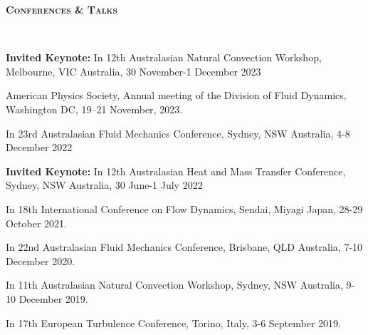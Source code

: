 \documentclass[letterpaper, 10pt]{article}
\newenvironment{changemargin}[2]{%
  \begin{list}{}{%
      \setlength{\topsep}{0pt}%
      \setlength{\leftmargin}{#1}%
      \setlength{\rightmargin}{#2}%
      \setlength{\listparindent}{\parindent}%
      \setlength{\itemindent}{\parindent}%
      \setlength{\parsep}{\parskip}%
    }%
  \item[]}{\end{list}
}
\newcommand{\lineover}{
  \begin{changemargin}{-0.05in}{-0.05in}
    \vspace*{-8pt}
    \hrulefill \\
    \vspace*{-2pt}
  \end{changemargin}
}
\newcommand{\header}[1]{
  \begin{changemargin}{-0.5in}{-0.5in}
    \textbf{\scshape{#1}}\\
    \lineover
  \end{changemargin}
}
\newenvironment{body} {
  \vspace*{-16pt}
  \begin{changemargin}{-0.25in}{-0.5in}
  }
  {\end{changemargin}
}
\begin{document}
\header{Conferences \& Talks}
\begin{body}
  \vspace{14pt}

  {\bf Invited Keynote:} %
  In 12th Australasian Natural Convection Workshop, Melbourne, VIC Australia, 30 November-1 December 2023
  
  \smallskip

American Physics Society, Annual meeting of the Division of Fluid Dynamics, Washington DC, 19--21 November, 2023.
    
  \smallskip
  
  In 23rd Australasian Fluid Mechanics Conference, Sydney, NSW Australia, 4-8 December 2022
  
  \smallskip
  
  {\bf Invited Keynote: } 
  In 12th Australasian Heat and Mass Transfer Conference, Sydney, NSW Australia, 30 June-1 July 2022
  
  \smallskip

    In 18th International Conference on Flow Dynamics, Sendai, Miyagi Japan, 28-29 October 2021.

  \smallskip

  In 22nd Australasian Fluid Mechanics Conference, Brisbane, QLD Australia, 7-10 December 2020.
  
  \smallskip
  
  In 11th Australasian Natural Convection Workshop, Sydney, NSW Australia, 9-10 December 2019.
  
  \smallskip
  
  In 17th European Turbulence Conference, Torino, Italy, 3-6 September 2019.
  

\end{body}
\end{document}
